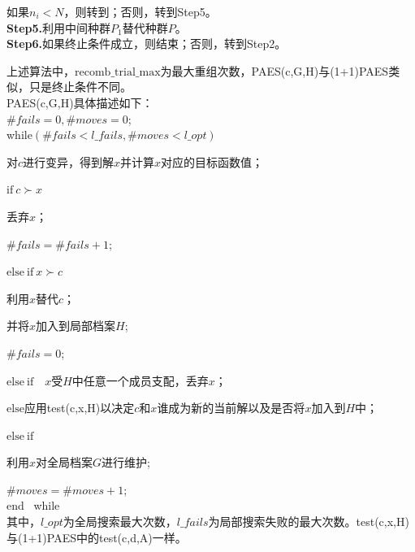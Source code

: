            \par
            如果$n_i < N$，则转到；否则，转到Step5。\\
            \textbf{Step5.}利用中间种群$P_1$替代种群$P$。\\
            \textbf{Step6.}如果终止条件成立，则结束；否则，转到Step2。
            \par
            上述算法中，$\mathrm{recomb\_trial\_max}$为最大重组次数，PAES(c,G,H)与(1+1)PAES类似，只是终止条件不同。\\
            PAES(c,G,H)具体描述如下：\\
            $\#fails=0,\#moves=0$;\\
            while$(\#fails<l\_fails,\#moves<l\_opt)$\par
            对$c$进行变异，得到解$x$并计算$x$对应的目标函数值；\par
            $\mathrm{if}\ c \succ x$\par
            \qquad 丢弃$x$；\par
            \qquad $\#fails=\#fails+1$;\par
            $\mathrm{else\ if}\ x\succ c$\par
            \qquad 利用$x$替代$c$；\par
            \qquad 并将$x$加入到局部档案$H$;\par
            \qquad $\# fails=0$;\par
            $\mathrm{else\ if}\quad x$受$H$中任意一个成员支配，丢弃$x$；\par
            $\mathrm{else}$\quad 应用test(c,x,H)以决定$c$和$x$谁成为新的当前解以及是否将$x$加入到$H$中；\par
            $\mathrm{else\ if}$\par
            利用$x$对全局档案$G$进行维护;\par
            $\#moves=\#moves+1$;\\
            end \ while\\
            其中，$l\_opt$为全局搜索最大次数，$l\_fails$为局部搜索失败的最大次数。test(c,x,H)与(1+1)PAES中的test(c,d,A)一样。
